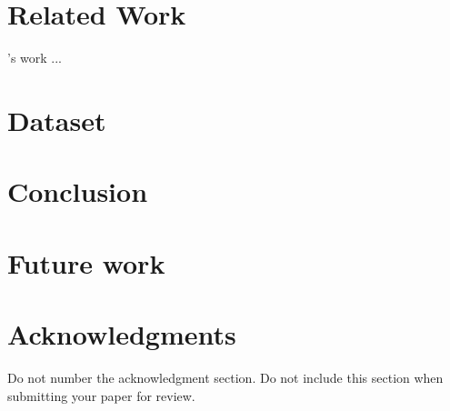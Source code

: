 \documentclass[11pt]{article}
\begin{document}
\section{Related Work}

's work ...


\section{Dataset}

\section{Conclusion}

\section{Future work}





\section*{Acknowledgments}

Do not number the acknowledgment section. Do not include this section when submitting your paper for review.



\end{document}
